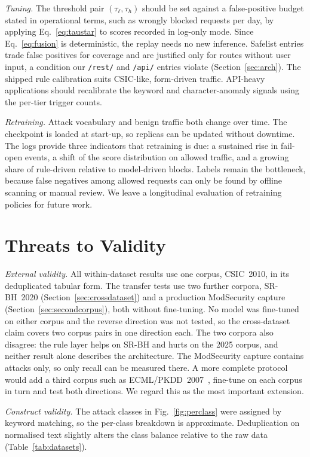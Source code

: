 \documentclass[preprint,11pt]{elsarticle}
\begin{document}
\emph{Tuning.} The threshold pair $(\tau_\ell,\tau_h)$ should be set against
a false-positive budget stated in operational terms, such as wrongly
blocked requests per day, by applying Eq.~\eqref{eq:taustar} to scores
recorded in log-only mode. Since Eq.~\eqref{eq:fusion} is deterministic,
the replay needs no new inference. Safelist entries trade false positives
for coverage and are justified only for routes without user input, a
condition our \texttt{/rest/} and \texttt{/api/} entries violate
(Section~\ref{sec:arch}). The shipped rule calibration suits CSIC-like,
form-driven traffic. API-heavy applications should recalibrate the keyword
and character-anomaly signals using the per-tier trigger counts.

\emph{Retraining.} Attack vocabulary and benign traffic both change over
time. The checkpoint is loaded at start-up, so replicas can be updated
without downtime. The logs provide three indicators that retraining is
due: a sustained rise in fail-open events, a shift of the score
distribution on allowed traffic, and a growing share of rule-driven
relative to model-driven blocks. Labels remain the bottleneck, because
false negatives among allowed requests can only be found by offline
scanning or manual review. We leave a longitudinal evaluation of retraining
policies for future work.

\section{Threats to Validity}
\label{sec:threats}
\emph{External validity.} All within-dataset results use one corpus,
CSIC~2010, in its deduplicated tabular form. The transfer tests use two
further corpora, SR-BH~2020 (Section~\ref{sec:crossdataset}) and a
production ModSecurity capture (Section~\ref{sec:secondcorpus}), both
without fine-tuning. No model was fine-tuned on either corpus and the
reverse direction was not tested, so the cross-dataset claim covers two
corpus pairs in one direction each. The two corpora also disagree: the
rule layer helps on SR-BH and hurts on the 2025 corpus, and neither result
alone describes the architecture. The ModSecurity capture contains attacks
only, so only recall can be measured there. A more complete protocol would
add a third corpus such as ECML/PKDD~2007~\cite{pkdd2007}, fine-tune on
each corpus in turn and test both directions. We regard this as the most
important extension.

\emph{Construct validity.} The attack classes in Fig.~\ref{fig:perclass}
were assigned by keyword matching, so the per-class breakdown is
approximate. Deduplication on normalised text slightly alters the class
balance relative to the raw data (Table~\ref{tab:datasets}).
\end{document}
